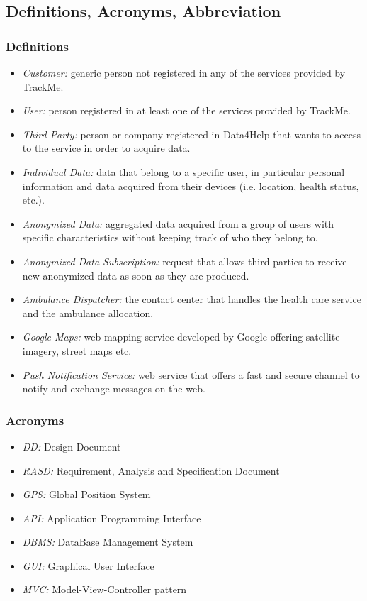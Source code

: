 \documentclass[a4paper]{article}
\begin{document}
\subsection{Definitions, Acronyms, Abbreviation}

\subsubsection{Definitions}
\begin{itemize}
    \item \textit{Customer:} generic person not registered in any of the services provided by TrackMe. 
    \item \textit{User:} person registered in at least one of the services provided by TrackMe.
    \item \textit{Third Party:} person or company registered in Data4Help that wants to access to the service in order to acquire data.
    \item \textit{Individual Data:} data that belong to a specific user, in particular personal information and data acquired from their devices (i.e. location, health status, etc.).
    \item \textit{Anonymized Data:} aggregated data acquired from a group of users with specific characteristics without keeping track of who they belong to.
    \item \textit{Anonymized Data Subscription:} request that allows third parties to receive new anonymized data as soon as they are produced.
    \item \textit{Ambulance Dispatcher:} the contact center that handles the health care service and the ambulance allocation.
    \item \textit{Google Maps:} web mapping service developed by Google offering satellite imagery, street maps etc.
    \item \textit{Push Notification Service:} web service that offers a fast and secure channel to notify and exchange messages on the web.
\end{itemize}

\subsubsection{Acronyms}
\begin{itemize}
    \item \textit{DD:} Design Document
    \item \textit{RASD:} Requirement, Analysis and Specification Document
    \item \textit{GPS:} Global Position System
    \item \textit{API:} Application Programming Interface
    \item \textit{DBMS:} DataBase Management System
    \item \textit{GUI:} Graphical User Interface
    \item \textit{MVC:} Model-View-Controller pattern
\end{itemize}
\end{document}
